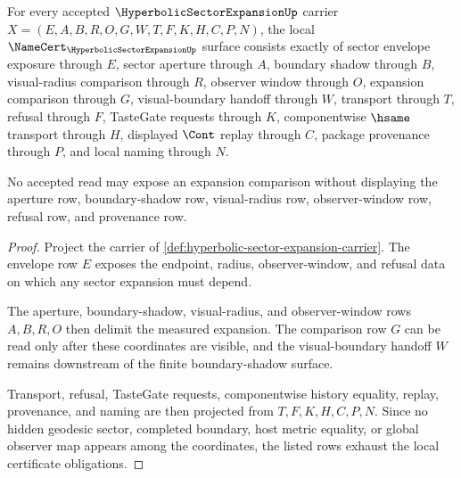\begin{theorem}
\label{thm:hyperbolic-sector-expansion-namecert-obligations}
For every accepted $\HyperbolicSectorExpansionUp$ carrier
$X=(E,A,B,R,O,G,W,T,F,K,H,C,P,N)$, the local
$\NameCert_{\HyperbolicSectorExpansionUp}$ surface consists exactly of sector
envelope exposure through $E$, sector aperture through $A$, boundary shadow
through $B$, visual-radius comparison through $R$, observer window through $O$,
expansion comparison through $G$, visual-boundary handoff through $W$,
transport through $T$, refusal through $F$, TasteGate requests through $K$,
componentwise $\hsame$ transport through $H$, displayed $\Cont$ replay through
$C$, package provenance through $P$, and local naming through $N$.

No accepted read may expose an expansion comparison without displaying the
aperture row, boundary-shadow row, visual-radius row, observer-window row,
refusal row, and provenance row.
\end{theorem}
\begin{proof}
Project the carrier of
\autoref{def:hyperbolic-sector-expansion-carrier}. The envelope row $E$ exposes
the endpoint, radius, observer-window, and refusal data on which any sector
expansion must depend.

The aperture, boundary-shadow, visual-radius, and observer-window rows
$A,B,R,O$ then delimit the measured expansion. The comparison row $G$ can be
read only after these coordinates are visible, and the visual-boundary handoff
$W$ remains downstream of the finite boundary-shadow surface.

Transport, refusal, TasteGate requests, componentwise history equality, replay,
provenance, and naming are then projected from $T,F,K,H,C,P,N$. Since no hidden
geodesic sector, completed boundary, host metric equality, or global observer
map appears among the coordinates, the listed rows exhaust the local
certificate obligations.
\end{proof}

